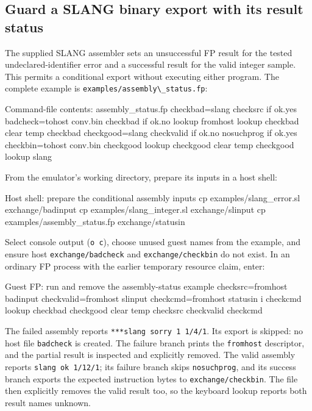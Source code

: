 \subsection{Guard a SLANG binary export with its result status}\label{guard-a-slang-binary-export-with-its-result-status}

The supplied SLANG assembler sets an unsuccessful FP result for the tested undeclared-identifier error and a successful result for the valid integer sample. This permits a conditional export without executing either program. The complete example is \passthrough{\lstinline!examples/assembly\_status.fp!}:

\begin{commandexample}{Command-file contents: assembly\_status.fp}
checkbad=slang checksrc
if ok.yes
badcheck=tohost conv.bin checkbad
if ok.no
lookup fromhost
lookup checkbad
clear temp checkbad
checkgood=slang checkvalid
if ok.no
nosuchprog
if ok.yes
checkbin=tohost conv.bin checkgood
lookup checkgood
clear temp checkgood
lookup slang
\end{commandexample}

From the emulator's working directory, prepare its inputs in a host shell:

\begin{commandexample}[language=sh]{Host shell: prepare the conditional assembly inputs}
cp examples/slang_error.sl exchange/badinput
cp examples/slang_integer.sl exchange/slinput
cp examples/assembly_status.fp exchange/statusin
\end{commandexample}

Select console output (\passthrough{\lstinline!o c!}), choose unused guest names from the example, and ensure host \passthrough{\lstinline!exchange/badcheck!} and \passthrough{\lstinline!exchange/checkbin!} do not exist. In an ordinary FP process with the earlier temporary resource claim, enter:

\begin{commandexample}{Guest FP: run and remove the assembly-status example}
checksrc=fromhost badinput
checkvalid=fromhost slinput
checkcmd=fromhost statusin
i checkcmd
lookup checkbad checkgood
clear temp checksrc checkvalid checkcmd
\end{commandexample}

The failed assembly reports \passthrough{\lstinline!***slang sorry 1 1/4/1!}. Its export is skipped: no host file \passthrough{\lstinline!badcheck!} is created. The failure branch prints the \passthrough{\lstinline!fromhost!} descriptor, and the partial result is inspected and explicitly removed. The valid assembly reports \passthrough{\lstinline!slang ok 1/12/1!}; its failure branch skips \passthrough{\lstinline!nosuchprog!}, and its success branch exports the expected instruction bytes to \passthrough{\lstinline!exchange/checkbin!}. The file then explicitly removes the valid result too, so the keyboard lookup reports both result names unknown.

